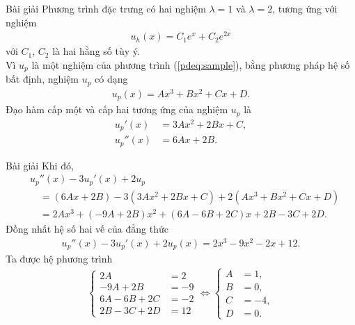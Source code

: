 \documentclass[9pt]{beamer}
\numberwithin{equation}{section}
\begin{document}
\begin{frame}
\begin{exampleblock}{Bài giải}
    Phương trình đặc trưng có hai nghiệm $\lambda = 1$ và $\lambda = 2$, tương ứng với nghiệm
    \begin{align*}
        u_h(x) = C_1 e^x + C_2 e^{2x}
    \end{align*}
    với $C_1$, $C_2$ là hai hằng số tùy ý. \\
    Vì $u_p$ là một nghiệm của phương trình (\ref{pdeq:sample}), bằng phương pháp hệ số bất định, nghiệm $u_p$ có dạng
    \begin{align*}
        u_p(x) = Ax^3 + Bx^2 + Cx + D.
    \end{align*}
    Đạo hàm cấp một và cấp hai tương ứng của nghiệm $u_p$ là
    \begin{align*}
        u_p'(x) &= 3Ax^2 + 2Bx + C, \\
        u_p''(x) &= 6Ax + 2B.
    \end{align*}
\end{exampleblock}

\end{frame}
\begin{frame}
\begin{exampleblock}{Bài giải}
     Khi đó,
    \begin{align*}
        &u_p''(x) - 3u_p'(x) + 2u_p \\
        &\quad = (6Ax + 2B) - 3(3Ax^2 + 2Bx + C) + 2(Ax^3 + Bx^2 + Cx + D) \\
        &\quad = 2Ax^3 + (-9A + 2B)x^2 + (6A - 6B + 2C)x + 2B - 3C + 2D.    
    \end{align*}
    Đồng nhất hệ số hai vế của đẳng thức
    \begin{align*}
        u_p''(x) - 3u_p'(x) + 2u_p(x) = 2x^3 - 9x^2 - 2x + 12.
    \end{align*}
    Ta được hệ phương trình
    \begin{align*}
        \begin{cases}
        2A &= 2 \\
        -9A + 2B &= -9 \\
        6A - 6B + 2C &= -2 \\
        2B - 3C + 2D &= 12
        \end{cases} \Leftrightarrow
        \begin{cases}
        A &= 1, \\
        B &= 0, \\
        C &= -4, \\
        D &= 0.
        \end{cases}
    \end{align*}
\end{exampleblock}
\end{frame}
\end{document}
